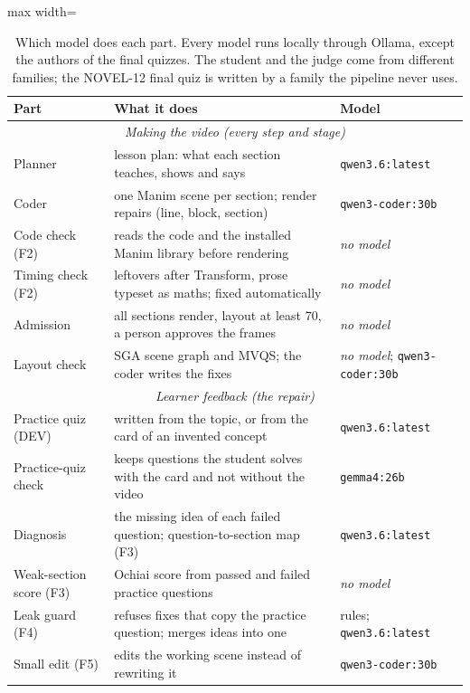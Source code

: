 \begin{table}[!tbp]\centering\footnotesize
\caption{Which model does each part. Every model runs locally through Ollama, except the authors of the final quizzes. The student and the judge come from different families; the NOVEL-12 final quiz is written by a family the pipeline never uses.}\label{tab:models}
\begin{adjustbox}{max width=\linewidth}\begin{tabular}{@{}lp{9.2cm}l@{}}\toprule Part & What it does & Model\\
\midrule
\multicolumn{3}{c}{\textit{Making the video (every step and stage)}}\\
Planner & lesson plan: what each section teaches, shows and says & \texttt{qwen3.6:latest} \\
Coder & one Manim scene per section; render repairs (line, block, section) & \texttt{qwen3-coder:30b} \\
Code check (F2) & reads the code and the installed Manim library before rendering & \textit{no model} \\
Timing check (F2) & leftovers after Transform, prose typeset as maths; fixed automatically & \textit{no model} \\
Admission & all sections render, layout at least 70, a person approves the frames & \textit{no model} \\
Layout check & SGA scene graph and MVQS; the coder writes the fixes & \textit{no model}; \texttt{qwen3-coder:30b} \\
\midrule
\multicolumn{3}{c}{\textit{Learner feedback (the repair)}}\\
Practice quiz (DEV) & written from the topic, or from the card of an invented concept & \texttt{qwen3.6:latest} \\
Practice-quiz check & keeps questions the student solves with the card and not without the video & \texttt{gemma4:26b} \\
Diagnosis & the missing idea of each failed question; question-to-section map (F3) & \texttt{qwen3.6:latest} \\
Weak-section score (F3) & Ochiai score from passed and failed practice questions & \textit{no model} \\
Leak guard (F4) & refuses fixes that copy the practice question; merges ideas into one & rules; \texttt{qwen3.6:latest} \\
Small edit (F5) & edits the working scene instead of rewriting it & \texttt{qwen3-coder:30b} \\

\end{tabular}
\end{adjustbox}
\end{table}
